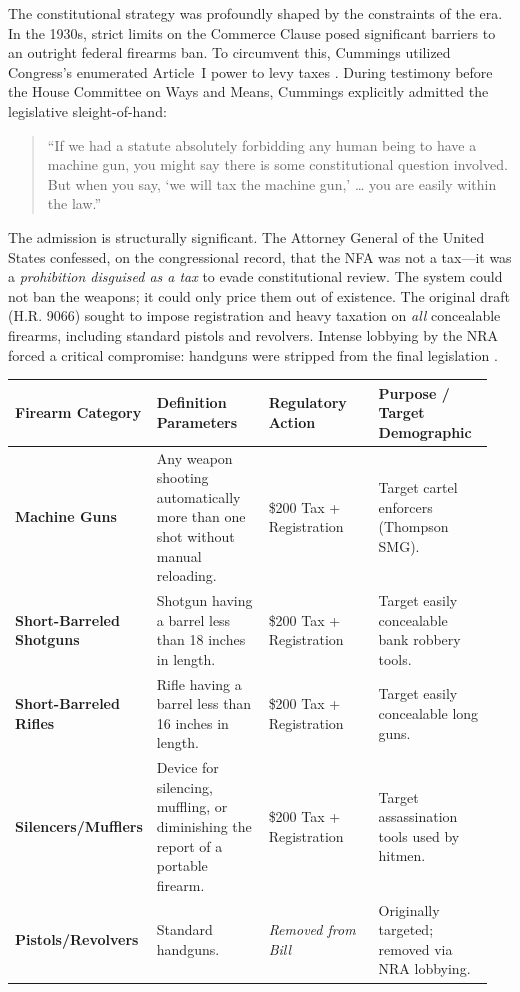 \documentclass[12pt,openany]{book}
\begin{document}
The constitutional strategy was profoundly shaped by the constraints of the era. In the 1930s, strict limits on the Commerce Clause posed significant barriers to an outright federal firearms ban. To circumvent this, Cummings utilized Congress's enumerated Article~I power to levy taxes \cite{cornell_nfa, fulbright_nfa}. During testimony before the House Committee on Ways and Means, Cummings explicitly admitted the legislative sleight-of-hand:

\begin{quote}
``If we had a statute absolutely forbidding any human being to have a machine gun, you might say there is some constitutional question involved. But when you say, `we will tax the machine gun,' \ldots{} you are easily within the law.'' \cite{cornell_nfa}
\end{quote}

The admission is structurally significant. The Attorney General of the United States confessed, on the congressional record, that the NFA was not a tax---it was a \textit{prohibition disguised as a tax} to evade constitutional review. The system could not ban the weapons; it could only price them out of existence. The original draft (H.R. 9066) sought to impose registration and heavy taxation on \textit{all} concealable firearms, including standard pistols and revolvers. Intense lobbying by the NRA forced a critical compromise: handguns were stripped from the final legislation \cite{recoil_nfa, ebsco_nfa}.

{\def\LTcaptype{none}
\begin{longtable}[]{@{}
  >{\raggedright\arraybackslash}p{0.20\linewidth}
  >{\raggedright\arraybackslash}p{0.25\linewidth}
  >{\raggedright\arraybackslash}p{0.25\linewidth}
  >{\raggedright\arraybackslash}p{0.25\linewidth}@{}}
\toprule
Firearm Category & Definition Parameters & Regulatory Action & Purpose / Target Demographic \\
\midrule
\endhead
\bottomrule
\endlastfoot
\textbf{Machine Guns} & Any weapon shooting automatically more than one shot without manual reloading. & \$200 Tax + Registration & Target cartel enforcers (Thompson SMG). \\
\textbf{Short-Barreled Shotguns} & Shotgun having a barrel less than 18 inches in length. & \$200 Tax + Registration & Target easily concealable bank robbery tools. \\
\textbf{Short-Barreled Rifles} & Rifle having a barrel less than 16 inches in length. & \$200 Tax + Registration & Target easily concealable long guns. \\
\textbf{Silencers/Mufflers} & Device for silencing, muffling, or diminishing the report of a portable firearm. & \$200 Tax + Registration & Target assassination tools used by hitmen. \\
\textbf{Pistols/Revolvers} & Standard handguns. & \emph{Removed from Bill} & Originally targeted; removed via NRA lobbying. \\
\end{longtable}
}
\end{document}
